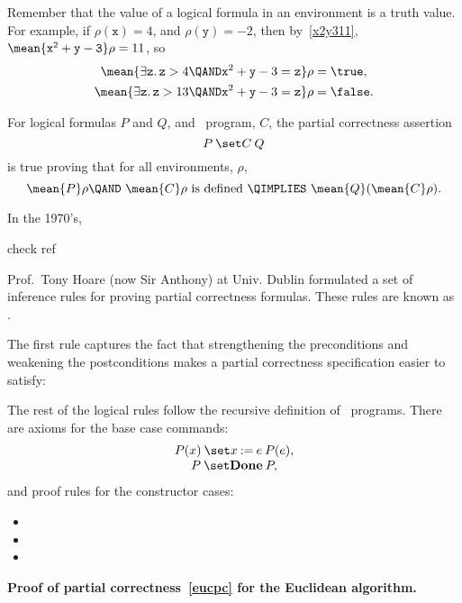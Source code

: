 Remember that the value of a logical formula in an environment is a truth value.
For example, if $\rho(\mathtt{x}) =4$, and $\rho(\mathtt{y}) =-2$, then
by~\eqref{x2y311}, $\mean{\mathtt{x^2+y -3}}\rho = 11$, so
\begin{align*}
\mean{\exists \mathtt{z}.\, \mathtt{z} > 4 \QAND \mathtt{x}^2+\mathtt{y} -3=\mathtt{z}}\rho & = \true,\\
\mean{\exists \mathtt{z}.\, \mathtt{z} > 13 \QAND \mathtt{x}^2+\mathtt{y} -3=\mathtt{z}}\rho & = \false.
\end{align*}

\begin{definition}\label{def_afterPCQ}
For logical formulas $P$ and $Q$, and \while\ program, $C$, the
partial correctness assertion
\[
\after{P}{C}{Q}
\]
is true proving that for all environments, $\rho$,
\[
\mean{P}\rho \QAND\ \mean{C}\rho \text{ is defined}\ \QIMPLIES\ \mean{Q}(\mean{C}\rho).
\]
\iffalse
 if $\mean{P}\rho$ is
true, and $\haltswith{C}{\rho}{\rho'}$ for some $\rho'$, then
$\mean{Q}\rho'$ is true.\fi
\end{definition}


In the 1970's, 
\begin{editingnotes}
check ref
\end{editingnotes}
Prof.\ Tony Hoare (now Sir Anthony) at Univ. Dublin formulated a set
of inference rules for proving partial correctness formulas.  These
rules are known as .

The first rule captures the fact that strengthening the preconditions
and weakening the postconditions makes a partial correctness
specification easier to satisfy:


The rest of the logical rules follow the recursive definition of \while\ programs.
There are axioms for the base case commands:
\[\begin{array}{c}
  \after{P(x)}{x \assigned e}{P(e)},\\
  \after{P}{\halt}{P},
\end{array}\]
and proof rules for the constructor cases:

\begin{itemize}

\item
{}

\item
{}
        {}

\item
{}
     {}
\end{itemize}

\begin{example}
\textbf{Proof of partial correctness~\eqref{eucpc} for the Euclidean algorithm.}
\end{example}


\endinput

